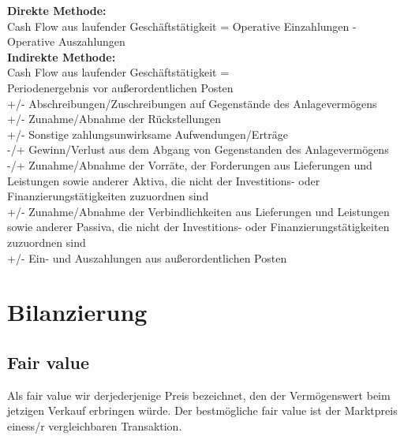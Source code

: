 \documentclass{article}
\begin{document}
\textbf{Direkte Methode:}\\
Cash Flow aus laufender Geschäftstätigkeit = Operative Einzahlungen - Operative Auszahlungen \\
\textbf{Indirekte Methode:}\\
Cash Flow aus laufender Geschäftstätigkeit = \\
Periodenergebnis vor außerordentlichen Posten\\
+/- Abschreibungen/Zuschreibungen auf Gegenstände des Anlagevermögens\\
+/- Zunahme/Abnahme der Rückstellungen\\
+/- Sonstige zahlungsunwirksame Aufwendungen/Erträge\\
-/+ Gewinn/Verlust aus dem Abgang von Gegenstanden des Anlagevermögens\\
-/+ Zunahme/Abnahme der Vorräte, der Forderungen aus Lieferungen und Leistungen sowie anderer Aktiva, die nicht der Investitions- oder Finanzierungstätigkeiten zuzuordnen sind \\
+/- Zunahme/Abnahme der Verbindlichkeiten aus Lieferungen und Leistungen sowie anderer Passiva, die nicht der Investitions- oder Finanzierungstätigkeiten zuzuordnen sind\\
+/- Ein- und Auszahlungen aus außerordentlichen Posten\\

\section{Bilanzierung}

\subsection{Fair value}

Als fair value wir derjederjenige Preis bezeichnet, den der Vermögenswert beim jetzigen Verkauf erbringen würde.
Der bestmögliche fair value ist der Marktpreis einess/r vergleichbaren Transaktion.
\end{document}

